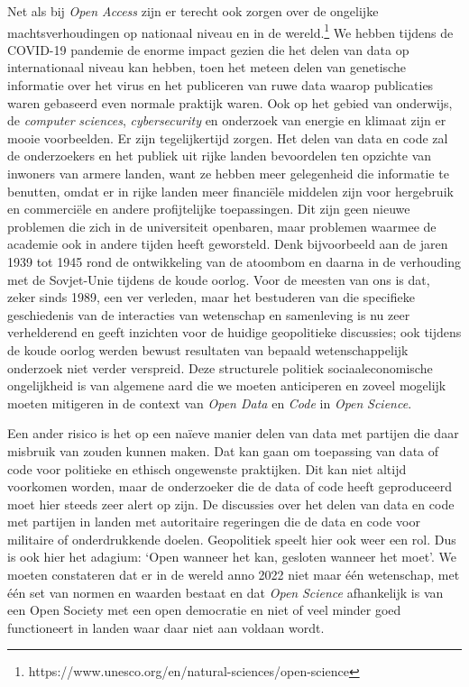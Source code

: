 \documentclass[smallauthor, chapterhaspagenum, nochapterinheader, pagenuminheader,  bigchapnum,medium2, tocpages, garamond, titleinheader]{jote-book}
\begin{document}
	Net als bij \emph{Open Access} zijn er terecht ook zorgen over de ongelijke machtsverhoudingen op nationaal niveau en in de wereld.\footnote{https://www.unesco.org/en/natural-sciences/open-science} We hebben tijdens de COVID-19 pandemie de enorme impact gezien die het delen van data op internationaal niveau kan hebben, toen het meteen delen van genetische informatie over het virus en het publiceren van ruwe data waarop publicaties waren gebaseerd even normale praktijk waren. Ook op het gebied van onderwijs, de \emph{computer }\emph{sciences}, \emph{cybersecurity} en onderzoek van energie en klimaat zijn er mooie voorbeelden. Er zijn tegelijkertijd zorgen. Het delen van data en code zal de onderzoekers en het publiek uit rijke landen bevoordelen ten opzichte van inwoners van armere landen, want ze hebben meer gelegenheid die informatie te benutten, omdat er in rijke landen meer financiële middelen zijn voor hergebruik en commerciële en andere profijtelijke toepassingen. Dit zijn geen nieuwe problemen die zich in de universiteit openbaren, maar problemen waarmee de academie ook in andere tijden heeft geworsteld. Denk bijvoorbeeld aan de jaren 1939 tot 1945 rond de ontwikkeling van de atoombom en daarna in de verhouding met de Sovjet-Unie tijdens de koude oorlog. Voor de meesten van ons is dat, zeker sinds 1989, een ver verleden, maar het bestuderen van die specifieke geschiedenis van de interacties van wetenschap en samenleving is nu zeer verhelderend en geeft inzichten voor de huidige geopolitieke discussies; ook tijdens de koude oorlog werden bewust resultaten van bepaald wetenschappelijk onderzoek niet verder verspreid. Deze structurele politiek sociaaleconomische ongelijkheid is van algemene aard die we moeten anticiperen en zoveel mogelijk moeten mitigeren in de context van \emph{Open Data} en \emph{Code} in \emph{Open }\emph{Science}.



	Een ander risico is het op een naïeve manier delen van data met partijen die daar misbruik van zouden kunnen maken. Dat kan gaan om toepassing van data of code voor politieke en ethisch ongewenste praktijken. Dit kan niet altijd voorkomen worden, maar de onderzoeker die de data of code heeft geproduceerd moet hier steeds zeer alert op zijn. De discussies over het delen van data en code met partijen in landen met autoritaire regeringen die de data en code voor militaire of onderdrukkende doelen. Geopolitiek speelt hier ook weer een rol. Dus is ook hier het adagium: ‘Open wanneer het kan, gesloten wanneer het moet'. We moeten constateren dat er in de wereld anno 2022 niet maar één wetenschap, met één set van normen en waarden bestaat en dat \emph{Open }\emph{Science} afhankelijk is van een Open Society met een open democratie en niet of veel minder goed functioneert in landen waar daar niet aan voldaan wordt.
\end{document}
